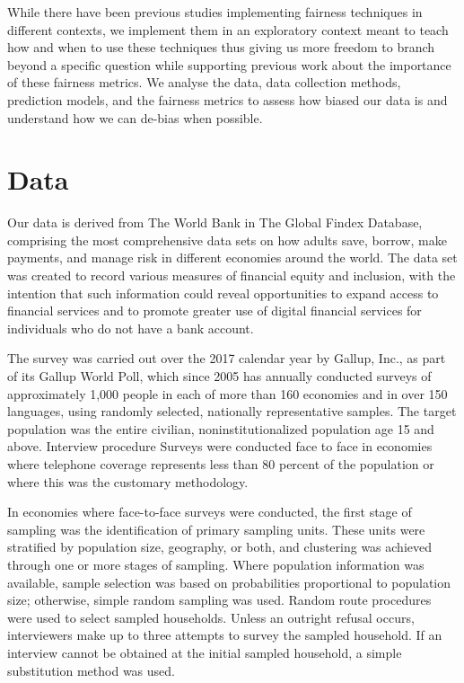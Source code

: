 \documentclass[water,article,submit,moreauthors,pdftex]{mdpi}
\begin{document}
While there have been previous studies implementing fairness techniques
in different contexts\citep{deho2022existing, kim2022information}, we
implement them in an exploratory context meant to teach how and when to
use these techniques thus giving us more freedom to branch beyond a
specific question while supporting previous work about the importance of
these fairness metrics\citep{anahideh2022fair, barocas_fairness_nodate}.
We analyse the data, data collection methods, prediction models, and the
fairness metrics to assess how biased our data is and understand how we
can de-bias when possible.

\hypertarget{data}{%
\section{Data}\label{data}}

Our data is derived from The World Bank in The Global Findex Database,
comprising the most comprehensive data sets on how adults save, borrow,
make payments, and manage risk in different economies around the world.
The data set was created to record various measures of financial equity
and inclusion, with the intention that such information could reveal
opportunities to expand access to financial services and to promote
greater use of digital financial services for individuals who do not
have a bank account.

The survey was carried out over the 2017 calendar year by Gallup, Inc.,
as part of its Gallup World Poll, which since 2005 has annually
conducted surveys of approximately 1,000 people in each of more than 160
economies and in over 150 languages, using randomly selected, nationally
representative samples. The target population was the entire civilian,
noninstitutionalized population age 15 and above. Interview procedure
Surveys were conducted face to face in economies where telephone
coverage represents less than 80 percent of the population or where this
was the customary methodology.

In economies where face-to-face surveys were conducted, the first stage
of sampling was the identification of primary sampling units. These
units were stratified by population size, geography, or both, and
clustering was achieved through one or more stages of sampling. Where
population information was available, sample selection was based on
probabilities proportional to population size; otherwise, simple random
sampling was used. Random route procedures were used to select sampled
households. Unless an outright refusal occurs, interviewers make up to
three attempts to survey the sampled household. If an interview cannot
be obtained at the initial sampled household, a simple substitution
method was used.
\end{document}
